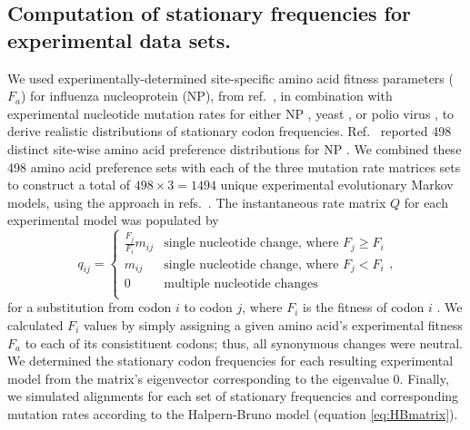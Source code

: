 \documentclass[11pt]{article}
\begin{document}
\subsection*{Computation of stationary frequencies for experimental data sets.}
We used experimentally-determined site-specific amino acid fitness parameters ($F_a$) for influenza nucleoprotein (NP), from ref.\ \cite{Bloom2014a}, in combination with experimental nucleotide mutation rates for either NP \cite{Bloom2014a}, yeast \cite{Zhu2014}, or polio virus \cite{Acevedo2014}, to derive realistic distributions of stationary codon frequencies. Ref.\ \cite{Bloom2014a} reported 498 distinct site-wise amino acid preference distributions for NP \cite{Bloom2014a}. We combined these 498 amino acid preference sets with each of the three mutation rate matrices sets to construct a total of $498 \times 3 = 1494$ unique experimental evolutionary Markov models, using the approach in refs.\ \cite{Bloom2014a,Bloom2014b}. The instantaneous rate matrix $Q$ for each experimental model was populated by 
\begin{equation}
q_{ij} =  \left\{ 
\begin{array}{rl}
  \frac{F_j}{F_i}m_{ij} &\mbox{single nucleotide change, where $F_j \geq F_i$} \\
  m_{ij}                &\mbox{single nucleotide change, where $F_j < F_i$}  \\ 
  0                       &\mbox{multiple nucleotide changes} \\        
\end{array} \right.,
\end{equation} for a substitution from codon $i$ to codon $j$, where $F_i$ is the fitness of codon $i$ \cite{Bloom2014a,Bloom2014b}. We calculated $F_i$ values by simply assigning a given amino acid's experimental fitness $F_a$ to each of its consistituent codons; thus, all synonymous changes were neutral. We determined the stationary codon frequencies for each resulting experimental model from the matrix's eigenvector corresponding to the eigenvalue 0. Finally, we simulated alignments for each set of stationary frequencies and corresponding mutation rates according to the Halpern-Bruno model (equation \eqref{eq:HBmatrix}).   

		
\end{document}
